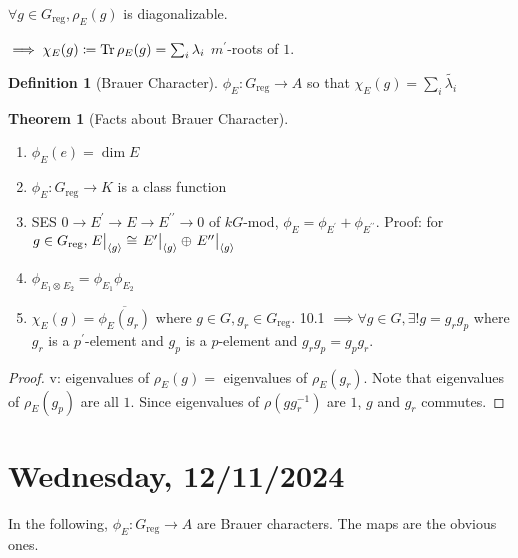 \documentclass{article}
\theoremstyle{definition}
\newtheorem*{definition}{Definition}
\newtheorem{theorem}{Theorem}
\begin{document}
\(\forall g\in G_{\text{reg}}, \rho_E(g)\) is diagonalizable.

\(\implies \chi_E(g) \coloneqq \Tr \rho_E(g) = \sum_{i} \lambda_{i}\) \(m^{\prime}\)-roots of \(1\).

\begin{definition}
    [Brauer Character]

    \(\phi_E : G_{\text{reg}} \to A\) so that \(\chi_E(g) = \sum_{i} \widetilde{\lambda_i} \)  
\end{definition}

\begin{theorem}
    [Facts about Brauer Character]

    \begin{enumerate}[label=\roman*)]
        \item \(\phi_E(e) = \dim E\) 
        \item \(\phi_E : G_{\text{reg}} \to K\) is a class function
        \item SES \(0 \to E^{\prime} \to E \to E^{\prime\prime} \to 0\) of \(kG\)-mod, \(\phi_E = \phi_{E^{\prime}} + \phi_{E^{\prime\prime}}\). Proof: for \(g\in G_{\operatorname{reg}}, \eval{E}_{\langle g \rangle}^{} \cong \eval{E^{\prime}}_{\langle g \rangle}^{} \oplus \eval{E^{\prime\prime} }_{\langle g \rangle }^{}  \)   
        \item \(\phi_{E_1 \otimes_{} E_2} = \phi_{E_1} \phi_{E_2}\)
        \item \(\chi_E(g) = \overline{\phi_E(g_r)}\) where \(g\in G, g_r \in G_{\text{reg}}\). 10.1 \(\implies \forall g\in G, \exists ! g = g_r g_p\) where \(g_r\) is a \(p^{\prime}\)-element and \(g_p\) is a \(p\)-element and \(g_r g_p = g_p g_r\).   
    \end{enumerate} 
\end{theorem}

\begin{proof}
    v: eigenvalues of \(\rho_E(g) =\) eigenvalues of \(\rho_E(g_r)\). Note that eigenvalues of \(\rho_E(g_p)\) are all \(1\). Since eigenvalues of \(\rho (g g_r ^{-1})\) are \(1\), \(g\) and \(g_r\) commutes. 
\end{proof}

\section*{Wednesday, 12/11/2024}

In the following, \(\phi_E:G_{\text{reg}}\to A\) are Brauer characters. The maps are the obvious ones. 
\end{document}

